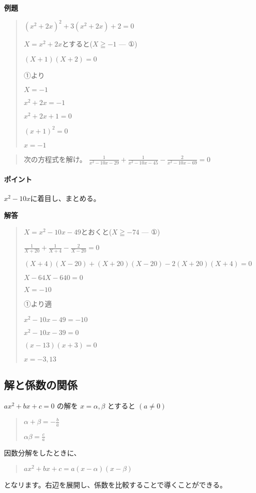 \documentclass[uplatex,fleqn]{jsbook}
\begin{document}
\vspace{15pt} {\large \textbf{例題}}
\begin{quote}
    $\left(x^2+2x\right)^2+3\left(x^2+2x\right)+2=0$

    $X=x^2+2x$とすると($X\geqq-1$ --- ①)

    $\left(X+1\right)\left(X+2\right)=0$

    ①より

    $X=-1$

    $x^2+2x=-1$

    $x^2+2x+1=0$

    $\left(x+1\right)^2=0$

    $x=-1$
\end{quote}

\begin{quote}
    次の方程式を解け。
    $\displaystyle \frac{1}{x^2-10x-29}+\frac{1}{x^2-10x-45}-\frac{2}{x^2-10x-69}=0$
\end{quote}

\paragraph{ポイント}$x^2-10x$に着目し、まとめる。

\vspace{15pt} {\large \textbf{解答}}
\begin{quote}
    $X=x^2-10x-49$とおくと($X\geqq-74$ --- ①)

    $\displaystyle \frac{1}{X+20}+\frac{1}{X+4}-\frac{2}{X-20}=0$

    $\left(X+4\right)\left(X-20\right)+\left(X+20\right)\left(X-20\right)-2\left(X+20\right)\left(X+4\right)=0$

    $X-64X-640=0$

    $X=-10$

    ①より適

    $x^2-10x-49=-10$

    $x^2-10x-39=0$

    $\left(x-13\right)\left(x+3\right)=0$

    $x=-3,13$
\end{quote}

\subsection{解と係数の関係}

$ax^2+bx+c=0$
の解を
$x=\alpha,\beta$
とすると
$\left(a\neq0\right)$
\begin{quote}
    $\displaystyle \alpha+\beta=-\frac{b}{a}$

    $\displaystyle \alpha\beta=\frac{c}{a}$
\end{quote}
因数分解をしたときに、
\begin{quote}
    $ax^2+bx+c=a\left(x-\alpha\right)\left(x-\beta\right)$
\end{quote}
となリます。右辺を展開し、係数を比較することで導くことができる。
\end{document}
